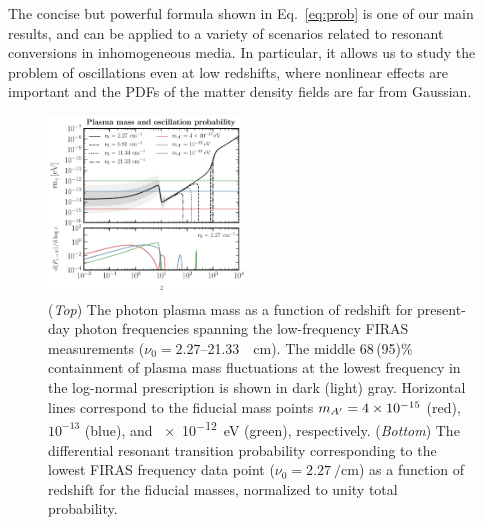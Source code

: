 \documentclass[prd,aps,10pt,nofootinbib,twocolumn,superscriptaddress,preprintnumbers,balancelastpage,longbibliography]{revtex4-1}
\begin{document}
The concise but powerful formula shown in Eq.~\eqref{eq:prob} is one of our main results, and can be applied to a variety of scenarios related to resonant conversions in inhomogeneous media. In particular, it allows us to study the problem of oscillations even at low redshifts, where nonlinear effects are important and the PDFs of the matter density fields are far from Gaussian. 

%
\begin{figure}[htbp]
    \centering
    \includegraphics[width=0.47\textwidth]{plots/m_Ap_single_LN}
    \caption{({\it Top}) The photon plasma mass as a function of redshift for present-day photon frequencies spanning the low-frequency FIRAS measurements ($\nu_0=2.27$--\SI{21.33}{\per\centi\meter}). The middle 68\,(95)\% containment of plasma mass fluctuations at the lowest frequency in the log-normal prescription is shown in dark (light) gray. Horizontal lines correspond to the fiducial mass points $m_{A^\prime}=4\times10^{-15}$ (red), $10^{-13}$ (blue), and \SI{e-12}{\eV} (green), respectively. ({\it Bottom}) The differential resonant transition probability corresponding to the lowest FIRAS frequency data point ($\nu_0=\SI{2.27}{\per\centi\meter}$) as a function of redshift for the fiducial masses, normalized to unity total probability.~} 
    \label{fig:plasma_mass}
\end{figure}
%
\end{document}
